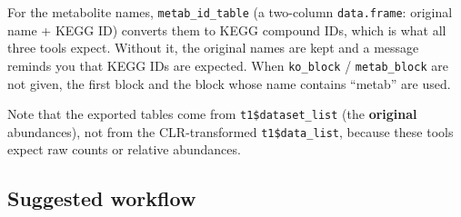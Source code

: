 \documentclass[
]{book}
\newenvironment{Shaded}{\begin{snugshade}}{\end{snugshade}}
\newcommand{\AttributeTok}[1]{\textcolor[rgb]{0.13,0.29,0.53}{#1}}
\newcommand{\CommentTok}[1]{\textcolor[rgb]{0.56,0.35,0.01}{\textit{#1}}}
\newcommand{\DecValTok}[1]{\textcolor[rgb]{0.00,0.00,0.81}{#1}}
\newcommand{\FunctionTok}[1]{\textcolor[rgb]{0.13,0.29,0.53}{\textbf{#1}}}
\newcommand{\NormalTok}[1]{#1}
\newcommand{\OtherTok}[1]{\textcolor[rgb]{0.56,0.35,0.01}{#1}}
\newcommand{\SpecialCharTok}[1]{\textcolor[rgb]{0.81,0.36,0.00}{\textbf{#1}}}
\newcommand{\StringTok}[1]{\textcolor[rgb]{0.31,0.60,0.02}{#1}}
\begin{document}
\begin{Shaded}
\end{Shaded}

For the metabolite names, \texttt{metab\_id\_table} (a two-column \texttt{data.frame}: original name + KEGG ID) converts them to KEGG compound IDs, which is what all three tools expect.
Without it, the original names are kept and a message reminds you that KEGG IDs are expected.
When \texttt{ko\_block} / \texttt{metab\_block} are not given, the first block and the block whose name contains ``metab'' are used.

Note that the exported tables come from \texttt{t1\$dataset\_list} (the \textbf{original} abundances), not from the CLR-transformed \texttt{t1\$data\_list}, because these tools expect raw counts or relative abundances.

\subsection{Suggested workflow}\label{suggested-workflow}
\end{document}

